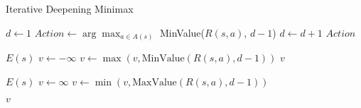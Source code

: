 \begin{algorithm}[H]
    \caption{Iterative Deepening Minimax}
    \label{alg:iterativedeepening}
    \begin{algorithmic}[1]
    
        \State $d \leftarrow 1$
            \State $Action \leftarrow \arg\max_{a \in A(s)}$ MinValue($R(s, a)$, $d - 1$)
            \State $d \leftarrow d + 1$
        \EndWhile
        \State \Return $Action$
    \EndProcedure
    \end{algorithmic}

    \begin{algorithmic}[1]

            \Return $E(s)$
        \EndIf
        \State $v \leftarrow -\infty$
            \State $v \leftarrow \max(v, \text{MinValue}(R(s, a), d-1))$
        \EndFor
        \State \Return $v$
    \EndProcedure
    
    \end{algorithmic}
        
    \begin{algorithmic}[1]

            \Return $E(s)$
        \EndIf
        \State $v \leftarrow \infty$
            \State $v \leftarrow \min(v, \text{MaxValue}(R(s, a), d-1))$
        \EndFor

        \State \Return $v$
    \EndProcedure

    \end{algorithmic}
\end{algorithm}